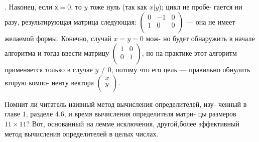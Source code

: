 \begin{myproof}
. Наконец, если $х = 0$, то $y$ тоже нуль (так как $x | y$); цикл не пробе-\linebreak
гается ни разу, результирующая матрица следующая: ${\left( \begin{array}{ccc}
0 & -1 & 0 \\
1 & 0 & 0 \\
\end{array} \right)}$ \linebreak --- она не имеет желаемой формы. Конечно, случай $x = y = 0$ мож- \linebreak но будет обнаружить в начале алгоритма и тогда ввести матрицу \linebreak ${\left( \begin{array}{ccc}
1 & 0 \\
0 & 1 \\
\end{array} \right)}$, но на практике этот алгоритм применяется только в случае \linebreak $y \ne 0$, потому что его цель --- правильно обнулить вторую компо- \linebreak ненту вектора ${\left( \begin{array}{ccc}
x \\
y \\
\end{array} \right)}$.
\end{myproof}
  Помнит ли читатель наивный метод вычисления определителей, изу- \linebreak ченный в главе $1$, разделе 4.6, и время вычисления определителя матри- \linebreak цы размеров $11 \times 11$? Вот, основанный на лемме исключения, другой,\linebreak более эффективный метод вычисления определителей в целых числах. 

